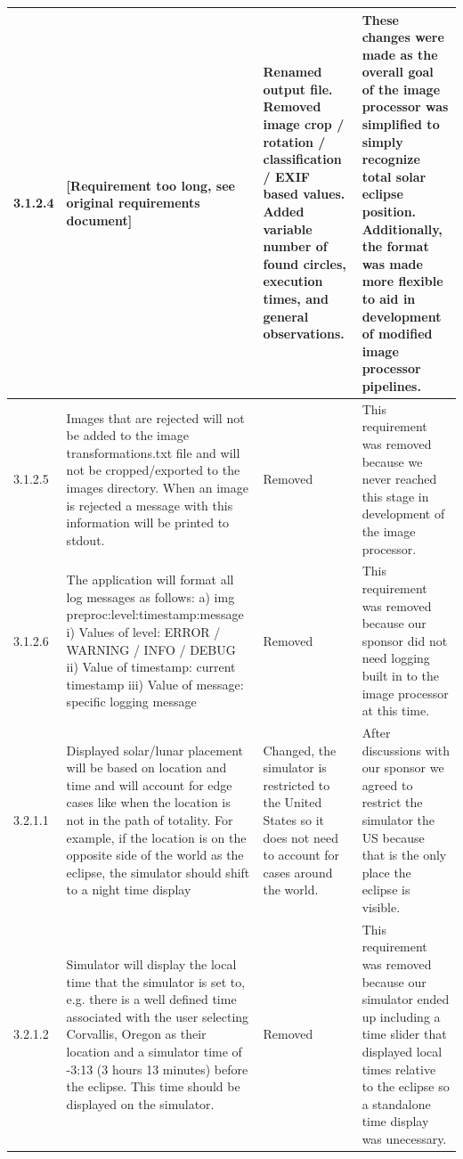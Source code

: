 \documentclass[10pt, onecolumn, draftclsnofoot, letterpaper, compsoc]{IEEEtran}
\begin{document}
\begin{longtable}{| p{} | p{} | p{} | p{} |}
	3.1.2.4 &
	[Requirement too long, see original requirements document] &
	Renamed output file. Removed image crop / rotation / classification / EXIF based values.
	Added variable number of found circles, execution times, and general observations. &
	These changes were made as the overall goal of the image processor was simplified to
	simply recognize total solar eclipse position. Additionally, the format was made more
	flexible to aid in development of modified image processor pipelines.
	\\ \hline

    3.1.2.5 &
	Images that are rejected will not be added to the image transformations.txt file and will not be cropped/exported
    to the images directory. When an image is rejected a message with this information will be printed to stdout. &
	Removed &
	This requirement was removed because we never reached this stage in development of the image processor.
	\\ \hline

    3.1.2.6 &
    The application will format all log messages as follows:
    a) img preproc:level:timestamp:message
    i) Values of level: ERROR / WARNING / INFO / DEBUG
    ii) Value of timestamp: current timestamp
    iii) Value of message: specific logging message &
    Removed &
    This requirement was removed because our sponsor did not need logging built in to the image processor at this time.
    \\ \hline

    3.2.1.1 &
    Displayed solar/lunar placement will be based on location and time and will account for edge cases like
    when the location is not in the path of totality. For example, if the location is on the opposite side of the
    world as the eclipse, the simulator should shift to a night time display &
    Changed, the simulator is restricted to the United States so it does not need to account for cases around the world. &
    After discussions with our sponsor we agreed to restrict the simulator the US because that is the only place the
    eclipse is visible.
    \\ \hline

    3.2.1.2 &
    Simulator will display the local time that the simulator is set to, e.g. there is a well defined time associated
    with the user selecting Corvallis, Oregon as their location and a simulator time of -3:13 (3 hours 13 minutes)
    before the eclipse. This time should be displayed on the simulator. &
    Removed &
    This requirement was removed because our simulator ended up including a time slider that displayed local times
    relative to the eclipse so a standalone time display was unecessary.
    \\ \hline


\end{longtable}
\end{document}
